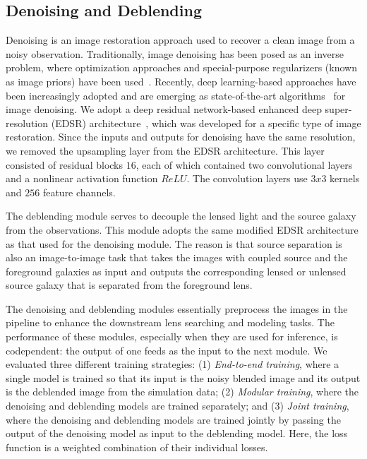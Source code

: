 \documentclass[12pt, twocolumn, apj]{openjournal}
\begin{document}
\subsection{Denoising and Deblending}
\label{sec:Denoise_deblend}
{Denoising} is an image restoration approach used to recover a clean image from
a noisy observation. 
Traditionally, image denoising has been posed as an inverse 
problem, where optimization approaches and special-purpose regularizers (known as image
priors) have been used~\citep{anwar2019deep}. Recently, deep learning-based approaches have been
increasingly adopted and are emerging as state-of-the-art algorithms~\citep{lim2017enhanced,zhang2018residual} for image denoising. 
We adopt a deep residual network-based enhanced deep super-resolution (EDSR)
architecture~\citep{lim2017enhanced}, which was developed for a specific type of image restoration. 
Since the inputs and outputs for denoising have the same resolution, we removed the upsampling layer from the EDSR architecture. This layer consisted of residual blocks $16$, each of which contained two convolutional layers and a nonlinear activation function $ReLU$. The convolution layers use $3 x 3$ kernels and $256$ feature channels. 


The deblending module serves to decouple the lensed light and the source galaxy from the observations. This module adopts the same modified EDSR architecture as that used for the denoising module. The reason is that source separation is also an image-to-image task that takes the images with coupled source and the foreground galaxies as input and outputs the corresponding lensed or unlensed source galaxy that is separated from the foreground lens.


The denoising and deblending modules essentially preprocess the images in the pipeline to enhance the downstream lens searching and modeling tasks. The performance of these modules, especially when they are used for inference, is codependent: the output of one feeds as the input to the next module. We evaluated three different training strategies: 
(1) \emph{End-to-end training}, where a single model is trained so that its input is the noisy blended image and its output is the deblended image from the simulation data;
(2) \emph{Modular training}, where the denoising and deblending models are trained separately;  and
(3) \emph{Joint training}, where the denoising and deblending models are trained jointly by passing the output of the denoising model as input to the deblending model. Here, the loss function is a weighted combination of their individual losses.
\end{document}
